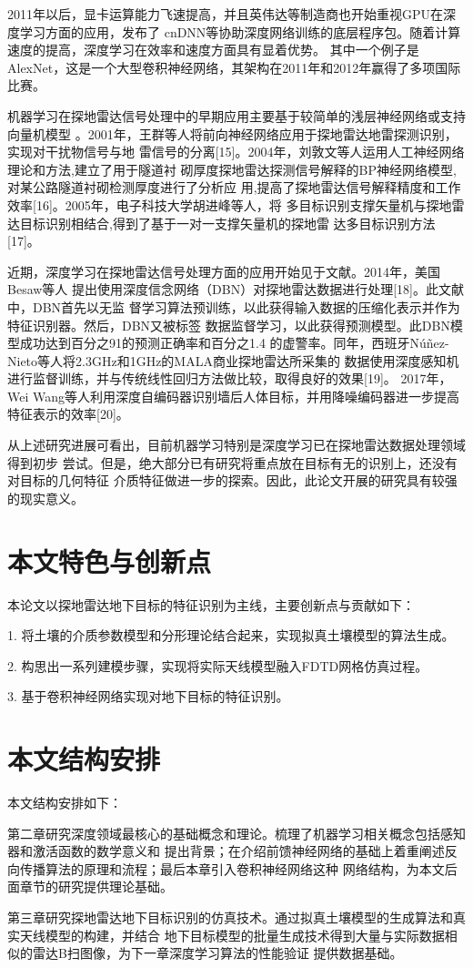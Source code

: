 
2011年以后，显卡运算能力飞速提高，并且英伟达等制造商也开始重视GPU在深度学习方面的应用，发布了
cnDNN等协助深度网络训练的底层程序包。随着计算速度的提高，深度学习在效率和速度方面具有显着优势。
其中一个例子是AlexNet，这是一个大型卷积神经网络，其架构在2011年和2012年赢得了多项国际比赛。

机器学习在探地雷达信号处理中的早期应用主要基于较简单的浅层神经网络或支持向量机模型
。2001年，王群等人将前向神经网络应用于探地雷达地雷探测识别，实现对干扰物信号与地
雷信号的分离[15]。2004年，刘敦文等人运用人工神经网络理论和方法,建立了用于隧道衬
砌厚度探地雷达探测信号解释的BP神经网络模型,对某公路隧道衬砌检测厚度进行了分析应
用,提高了探地雷达信号解释精度和工作效率[16]。2005年，电子科技大学胡进峰等人，将
多目标识别支撑矢量机与探地雷达目标识别相结合,得到了基于一对一支撑矢量机的探地雷
达多目标识别方法[17]。

近期，深度学习在探地雷达信号处理方面的应用开始见于文献。2014年，美国Besaw等人
提出使用深度信念网络（DBN）对探地雷达数据进行处理[18]。此文献中，DBN首先以无监
督学习算法预训练，以此获得输入数据的压缩化表示并作为特征识别器。然后，DBN又被标签
数据监督学习，以此获得预测模型。此DBN模型成功达到百分之91的预测正确率和百分之1.4
的虚警率。同年，西班牙Núñez-Nieto等人将2.3GHz和1GHz的MALA商业探地雷达所采集的
数据使用深度感知机进行监督训练，并与传统线性回归方法做比较，取得良好的效果[19]。
2017年，Wei Wang等人利用深度自编码器识别墙后人体目标，并用降噪编码器进一步提高
特征表示的效率[20]。

从上述研究进展可看出，目前机器学习特别是深度学习已在探地雷达数据处理领域得到初步
尝试。但是，绝大部分已有研究将重点放在目标有无的识别上，还没有对目标的几何特征
介质特征做进一步的探索。因此，此论文开展的研究具有较强的现实意义。
\section{本文特色与创新点}
本论文以探地雷达地下目标的特征识别为主线，主要创新点与贡献如下：

1. 将土壤的介质参数模型和分形理论结合起来，实现拟真土壤模型的算法生成。

2. 构思出一系列建模步骤，实现将实际天线模型融入FDTD网格仿真过程。

3. 基于卷积神经网络实现对地下目标的特征识别。
\section{本文结构安排}
本文结构安排如下：

第二章研究深度领域最核心的基础概念和理论。梳理了机器学习相关概念包括感知器和激活函数的数学意义和
提出背景；在介绍前馈神经网络的基础上着重阐述反向传播算法的原理和流程；最后本章引入卷积神经网络这种
网络结构，为本文后面章节的研究提供理论基础。

第三章研究探地雷达地下目标识别的仿真技术。通过拟真土壤模型的生成算法和真实天线模型的构建，并结合
地下目标模型的批量生成技术得到大量与实际数据相似的雷达B扫图像，为下一章深度学习算法的性能验证
提供数据基础。

